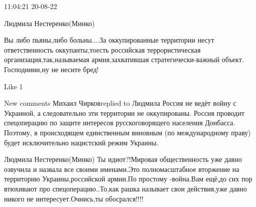  
 
 
 
 

11:04:21 20-08-22

Людмила Нестеренко(Минко)

Вы либо пьяны,либо больны....За оккупированные территории несут ответственность
оккупанты,тоесть российская террористическая организация,так,называемая
армия,захватившая стратегически-важный объект.  Господииии,ну не несите бред!

    Like 1

New comments
Михаил Чирковreplied to Людмила
Россия не ведёт войну с Украиной, а следовательно эти территории не оккупированы.
Россия проводит спецоперацию по защите интересов русскоговорящего населения Донбасса.
Поэтому, в происходящем единственным виновным (по международному праву) будет исключительно нацистский режим Украины.

Людмила Нестеренко(Минко)
Ты идиот?!Мировая общественность уже давно озвучила и назвала все своими именами.Это полномасштабное вторжение на территорию Украины,российской армии.По простому -война.Вам ещё,до сих пор втюхивают про спецоперацию..То,как рашка называет свои действия,уже давно никого не интересует.Очнись,ты обосрался!!!!
